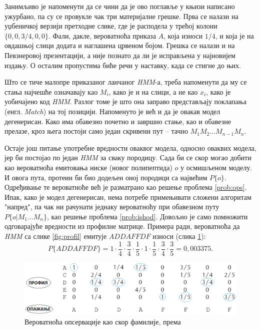 \documentclass[12pt,oneside]{memoir}
\begin{document}
\begin{CJK}{UTF8}{ipxm}
Занимљиво је напоменути да се чини да је ово поглавље у књизи написано ужурбано, па су се провукле чак три материјалне грешке. Прва се налази на уџбеничкој верзији претходне слике, где је расподела у трећој колони $\{0, 0, 3/4, 0, 0\}$. Фали, дакле, вероватноћа приказа $A$, која износи $1/4$, и која је на овдашњој слици додата и наглашена црвеном бојом. Грешка се налази и на Певзнеровој презентацији, а није познато да ли је исправљена у најновијем издању. О осталим пропустима биће речи у наставку, када се стигне до њих.

Што се тиче малопре приказаног ланчаног \textit{HMM}-а, треба напоменути да му се стања најчешће означавају као $M_i$, како је и на слици, а не као $x_i$, како је уобичајено код \textit{HMM}. Разлог томе је што она заправо представљају поклапања (енгл. \textit{Match}) на тој позицији. Напоменуто је већ и да је овакав модел дегенерисан. Како има обавезно почетно и завршно стање, као и обавезне прелазе, кроз њега постоји само један скривени пут -- тачно $M_1M_2...M_{n-1}M_n$.

Остаје још питање употребне вредности оваквог модела, односно оваквих модела, јер би постојао по један \textit{HMM} за сваку породицу. Сада би се скор могао добити као вероватноћа емитовања ниске (новог полипептида) $o$ у осмишљеном моделу. И овога пута, протеин би био додељен оној породици са највећим $P\{o\}$. Одређивање те вероватноће већ је разматрано као решење проблема \ref{prob:ops}. Ипак, како је модел дегенерисан, нема потребе примењивати сложени алгоритам "напред", па чак ни рачунати једнаку вероватноћу при обавезном путу $P\{o | M_1...M_n\}$, као решење проблема \ref{prob:ishod}. Довољно је само помножити одговарајуће вредности из профилне матрице. Примера ради, вероватноћа да \textit{HMM} са слике \ref{fig:profil} емитује $ADDAFFDF$ износи (слика \ref{fig:prof_ishod}): $$P\{ADDAFFDF\} = 1 \cdot \frac{1}{4} \cdot \frac{3}{4} \cdot \frac{1}{5} \cdot 1 \cdot \frac{1}{5} \cdot \frac{3}{4} \cdot \frac{3}{5} = 0,003375.$$

\begin{figure}[H]
  \centering
  \includegraphics[width=\textwidth]{prof_ishod.png}
  \caption{Вероватноћа опсервације као скор фамилије, према \cite{compeau2015}}
  \label{fig:prof_ishod}
\end{figure}


\end{CJK}
\end{document}
